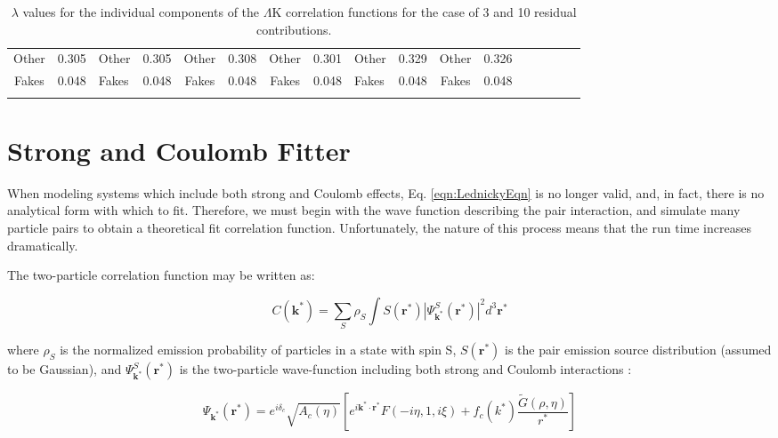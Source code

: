 \documentclass[ALICE,manyauthors]{cernphprep}
\newcommand{\LamK}{$\Lambda$K\xspace}
\begin{document}
\begin{landscape}
\begin{table}[htbp]
{\begin{tabular}{|c|cV{5.0}c|cV{5.0}c|cV{5.0}c|cV{5.0}c|cV{5.0}c|c|}
  Other & 0.305 & Other & 0.305 & Other & 0.308 & Other & 0.301 & Other & 0.329 & Other & 0.326 \\
  Fakes & 0.048 & Fakes & 0.048 & Fakes & 0.048 & Fakes & 0.048 & Fakes & 0.048 & Fakes & 0.048 \\
 \end{tabular}}
 \caption{$\lambda$ values for the individual components of the \LamK correlation functions for the case of 3 and 10 residual contributions.}
 \label{tab:LambdaValues_All}
\end{table}

\end{landscape}
\pagestyle{plain}


\section{Strong and Coulomb Fitter}
\label{App:CoulombFitter}

When modeling systems which include both strong and Coulomb effects, Eq. \ref{eqn:LednickyEqn} is no longer valid, and, in fact, there is no analytical form with which to fit.
Therefore, we must begin with the wave function describing the pair interaction, and simulate many particle pairs to obtain a theoretical fit correlation function.
Unfortunately, the nature of this process means that the run time increases dramatically.

The two-particle correlation function may be written as:

\begin{equation}
 C(\mathbf{k^{*}}) = \sum\limits_{S}\rho_{S}\int S(\mathbf{r^{*}})|\Psi^{S}_{\mathbf{k^{*}}}(\mathbf{r^{*}})|^{2}d^{3}\mathbf{r^{*}}
\label{eqn:GenCfEqn}
\end{equation}

where $\rho_{S}$ is the normalized emission probability of particles in a state with spin S, $S(\mathbf{r}^{*})$ is the pair emission source distribution (assumed to be Gaussian), and $\Psi^{S}_{\mathbf{k}^{*}}(\mathbf{r}^{*})$ is the two-particle wave-function including both strong and Coulomb interactions \cite{Lednicky:2005tb}:

\begin{equation}
 \Psi_{\mathbf{k^{*}}}(\mathbf{r^{*}}) = e^{i\delta_{c}}\sqrt{A_{c}(\eta)}[e^{i\mathbf{k^{*}} \cdot \mathbf{r^{*}}}F(-i\eta,1,i\xi) + f_{c}(k^{*})\frac{\tilde{G}(\rho,\eta)}{r^{*}}]
\label{eqn:CoulombWaveFcn}
\end{equation}
\end{document}
